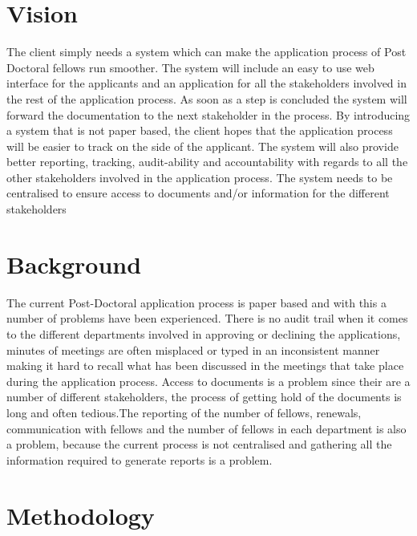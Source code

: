 \documentclass[12pt]{article}
\begin{document}
	\newpage
	\section{Vision} %
	\vspace{0.2in}
	The client simply needs a system which can make the application process of Post Doctoral fellows run smoother. The system will include an easy to use web interface for the applicants and an application for all the stakeholders involved in the rest of the application process. As soon as a step is concluded the system will forward the documentation to the next stakeholder in the process. By introducing a system that is not paper based, the client hopes that the application process will be easier to track on the side of the applicant. The system will also provide better reporting, tracking, audit-ability and accountability with regards to all the other stakeholders involved in the application process. The system needs to be centralised to ensure access to documents and/or information for the different stakeholders
	\vspace{0.5in}
	
	\section{Background} %
	\vspace{0.2in}
	The current Post-Doctoral application process is paper based and with this a number of problems have been experienced. There is no audit trail when it comes to the different departments involved in approving or declining the applications, minutes of meetings are often misplaced or typed in an inconsistent manner making it hard to recall what has been discussed in the meetings that take place during the application process. Access to documents is a problem since their are a number of different stakeholders, the process of getting hold of the documents is long and often tedious.The reporting of the number of fellows, renewals, communication with fellows and the number of fellows in each department is also a problem, because the current process is not centralised and gathering all the information required to generate reports is a problem.
	\vspace{0.5in}
	
	\newpage
	\section{Methodology} %
	\vspace{0.2in}
	
\end{document}
